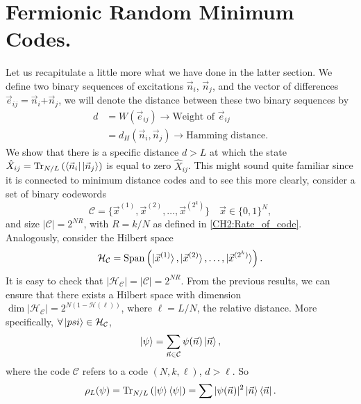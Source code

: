 \section{Fermionic Random Minimum Codes.}
Let us recapitulate a little more what we have done in the latter section. We define two binary sequences of excitations $\vec{n}_i$, $\vec{n}_j$, and the vector of differences $\vec{e}_{ij}=\vec{n}_i$+$\vec{n}_j$, we will denote the distance between these two binary sequences by
\begin{equation}
\begin{aligned}
d&=W(\vec{e}_{ij})\rightarrow \text{Weight of }\vec{e}_{ij} \\
&=d_{H}(\vec{n}_i, \vec{n}_j) \rightarrow \text{Hamming distance.}
\end{aligned}
\end{equation}
We show that there is a specific distance $d>L$ at which the state $\hat{X}_{ij}=\operatorname{Tr}_{N/L}\left(\mathinner{\langle{\vec{n}_i}|}\mathinner{|{\vec{n}_j}\rangle}\right)$ is equal to zero $\hat{X}_{ij}$. This might sound quite familiar since it is connected to minimum distance codes and to see this more clearly, consider a set of binary codewords
\begin{equation}
\mathcal{C}=\{\vec{x}^{(1)},\vec{x}^{(2)},\ldots,\vec{x}^{(2^k)}\} \quad \vec{x}\in\{0,1\}^{N},
\end{equation}
and size $|\mathcal{C}|=2^{NR}$, with $R=k/N$ as defined in \eqref{CH2:Rate_of_code}. Analogously, consider the Hilbert space
\begin{equation}
\mathcal{H}_{\mathcal{C}}=\operatorname{Span}\left(\mathinner{|{\vec{x}^{(1)}}\rangle},\mathinner{|{\vec{x}^{(2)}}\rangle},\ldots,\mathinner{|{\vec{x}^{(2^k)}}\rangle}\right).
\end{equation}
It is easy to check that $|\mathcal{H}_{\mathcal{C}}|=|\mathcal{C}|=2^{NR}$. From the previous results, we can ensure that there exists a Hilbert space with dimension $\operatorname{dim}|\mathcal{H}_{\mathcal{C}}|=2^{N(1-\mathcal{H}(\ell))}$, where $\ell = L/N$, the relative distance. More specifically, $\forall \mathinner{|{psi}\rangle}\in \mathcal{H}_{\mathcal{C}}$,
\begin{equation}
\mathinner{|{\psi}\rangle} = \sum_{\vec{n}\in\mathcal{C}}\psi(\vec{n})\mathinner{|{\vec{n}}\rangle},
\end{equation}
where the code $\mathcal{C}$ refers to a code $(N,k,\ell)$, $d>\ell$. So 
\begin{equation}
\rho_{L}(\psi) = \operatorname{Tr}_{N/L}\left(\mathinner{|{\psi}\rangle}\mathinner{\langle{\psi}|}\right) = \sum |\psi(\vec{n})|^2 \mathinner{|{\vec{n}}\rangle}\mathinner{\langle{\vec{n}}|}.
\end{equation}
